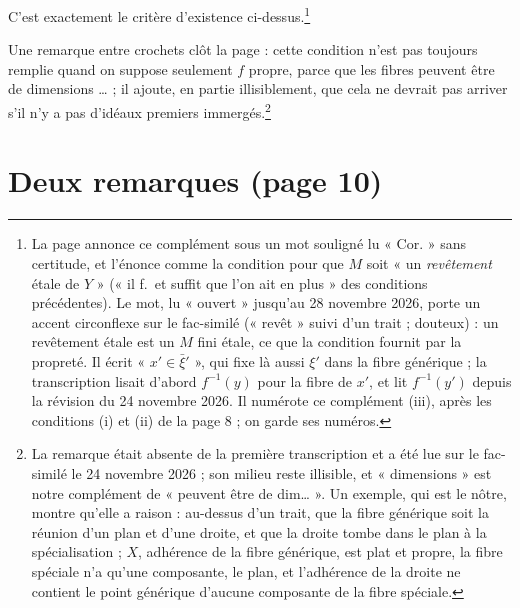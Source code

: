 \documentclass[11pt,a4paper]{article}
\begin{document}
C'est exactement le critère d'existence ci-dessus.\footnote{La page annonce ce
complément sous un mot souligné lu « Cor. » sans certitude, et l'énonce comme la
condition pour que $M$ soit « un \emph{revêtement} étale de $Y$ » (« il f.\ et
suffit que l'on ait en plus » des conditions précédentes). Le mot, lu
« ouvert » jusqu'au 28 novembre 2026, porte un accent circonflexe sur le
fac-similé (« revêt » suivi d'un trait ; douteux) : un revêtement étale est
un $M$ fini étale, ce que la condition fournit par la propreté. Il écrit « $x' \in \bar{\xi}'$ », qui
fixe là aussi $\xi'$ dans la fibre générique ; la transcription lisait d'abord
$f^{-1}(y)$ pour la fibre de $x'$, et lit $f^{-1}(y')$ depuis la révision du
24 novembre 2026. Il numérote ce complément (iii), après les conditions (i)
et (ii) de la page 8 ; on garde ses numéros.}

Une remarque entre crochets clôt la page : cette condition n'est pas toujours
remplie quand on suppose seulement $f$ propre, parce que les fibres peuvent
être de dimensions … ; il ajoute, en partie illisiblement, que cela ne
devrait pas arriver s'il n'y a pas d'idéaux premiers immergés.\footnote{La
remarque était absente de la première transcription et a été lue sur le
fac-similé le 24 novembre 2026 ; son milieu reste illisible, et « dimensions »
est notre complément de « peuvent être de dim… ». Un exemple, qui est le
nôtre, montre qu'elle a raison : au-dessus d'un trait, que la fibre générique
soit la réunion d'un plan et d'une droite, et que la droite tombe dans le plan
à la spécialisation ; $X$, adhérence de la fibre générique, est plat et
propre, la fibre spéciale n'a qu'une composante, le plan, et l'adhérence de la
droite ne contient le point générique d'aucune composante de la fibre
spéciale.}

\section*{Deux remarques (page 10)}
\end{document}
